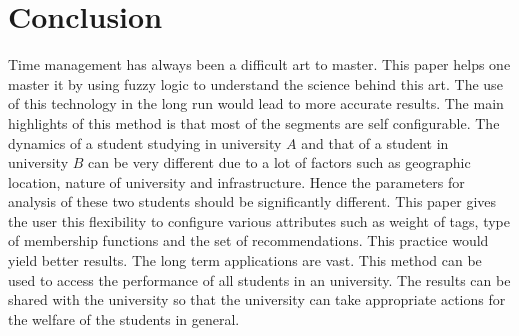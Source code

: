 \documentclass[conference]{IEEEtran}
\begin{document}

%

\section{Conclusion}
Time management has always been a difficult art to master. This paper helps one master it by using fuzzy logic to understand the science behind this art. The use of this technology in the long run would lead to more accurate results. The main highlights of this method is that most of the segments are self configurable. The dynamics of a student studying in university $A$ and that of a student in university $B$ can be very different due to a lot of factors such as geographic location, nature of university and infrastructure. Hence the parameters for analysis of these two students should be significantly different. This paper gives the user this flexibility to configure various attributes such as weight of tags, type of membership functions and the set of recommendations. This practice would yield better results.
The long term applications are vast. This method can be used to access the performance of all students in an university. The results can be shared with the university so that the university can take appropriate actions for the welfare of the students in general.
\end{document}
